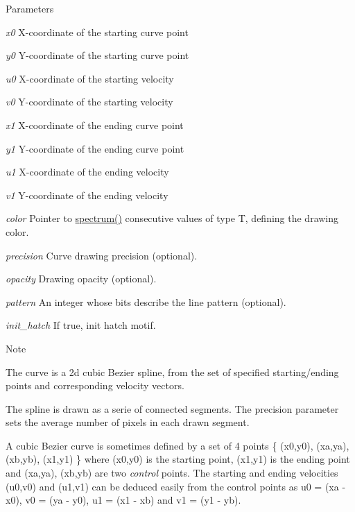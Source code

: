 \begin{DoxyParams}{Parameters}
\item[{\em x0}]X-\/coordinate of the starting curve point \item[{\em y0}]Y-\/coordinate of the starting curve point \item[{\em u0}]X-\/coordinate of the starting velocity \item[{\em v0}]Y-\/coordinate of the starting velocity \item[{\em x1}]X-\/coordinate of the ending curve point \item[{\em y1}]Y-\/coordinate of the ending curve point \item[{\em u1}]X-\/coordinate of the ending velocity \item[{\em v1}]Y-\/coordinate of the ending velocity \item[{\em color}]Pointer to {\ttfamily \hyperlink{structcimg__library_1_1CImg_acd2ee207fa512e34b45ff548082f70ba}{spectrum()}} consecutive values of type {\ttfamily T}, defining the drawing color. \item[{\em precision}]Curve drawing precision (optional). \item[{\em opacity}]Drawing opacity (optional). \item[{\em pattern}]An integer whose bits describe the line pattern (optional). \item[{\em init\_\-hatch}]If {\ttfamily true}, init hatch motif. \end{DoxyParams}
\begin{DoxyNote}{Note}

\begin{DoxyItemize}
\item The curve is a 2d cubic Bezier spline, from the set of specified starting/ending points and corresponding velocity vectors.
\item The spline is drawn as a serie of connected segments. The {\ttfamily precision} parameter sets the average number of pixels in each drawn segment.
\item A cubic Bezier curve is sometimes defined by a set of 4 points \{ ({\ttfamily x0},{\ttfamily y0}), ({\ttfamily xa},{\ttfamily ya}), ({\ttfamily xb},{\ttfamily yb}), ({\ttfamily x1},{\ttfamily y1}) \} where ({\ttfamily x0},{\ttfamily y0}) is the starting point, ({\ttfamily x1},{\ttfamily y1}) is the ending point and ({\ttfamily xa},{\ttfamily ya}), ({\ttfamily xb},{\ttfamily yb}) are two {\itshape control\/} points. The starting and ending velocities ({\ttfamily u0},{\ttfamily v0}) and ({\ttfamily u1},{\ttfamily v1}) can be deduced easily from the control points as {\ttfamily u0} = ({\ttfamily xa} -\/ {\ttfamily x0}), {\ttfamily v0} = ({\ttfamily ya} -\/ {\ttfamily y0}), {\ttfamily u1} = ({\ttfamily x1} -\/ {\ttfamily xb}) and {\ttfamily v1} = ({\ttfamily y1} -\/ {\ttfamily yb}). 
\end{DoxyItemize}
\end{DoxyNote}
